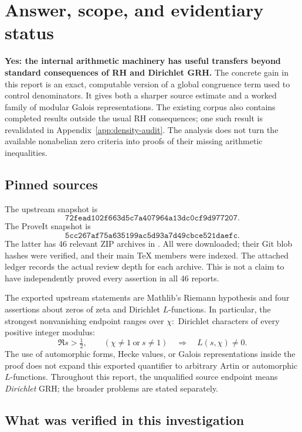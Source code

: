 \section{Answer, scope, and evidentiary status}
\label{sec:scope}

\textbf{Yes: the internal arithmetic machinery has useful transfers beyond
standard consequences of RH and Dirichlet GRH.} The concrete gain in this
report is an exact, computable version of a global congruence term used
to control denominators. It gives both a sharper source estimate and a
worked family of modular Galois representations. The existing corpus also
contains completed results outside the usual RH consequences; one such
result is revalidated in Appendix~\ref{app:density-audit}.
The analysis does not turn the available nonabelian zero criteria into
proofs of their missing arithmetic inequalities.

\subsection{Pinned sources}

The upstream snapshot is
\[
 \texttt{72fead102f663d5c7a407964a13dc0cf9d977207}.
\]
The ProveIt snapshot is
\[
 \texttt{5cc267af75a635199ac5d93a7d49cbce521daefc}.
\]
The latter has 46 relevant ZIP archives in .
All were downloaded; their Git blob hashes were verified, and their
main TeX members were indexed. The attached ledger records the actual
review depth for each archive. This is not a claim to have independently
proved every assertion in all 46 reports.\cite{upstream,priorinventory}

The exported upstream statements are Mathlib's Riemann hypothesis and
four assertions about zeros of zeta and Dirichlet \(L\)-functions.
In particular, the strongest nonvanishing endpoint ranges over
\(\chi:\) Dirichlet characters of every positive integer modulus:
\[
 \Re s>\tfrac12,\qquad (\chi\ne1\ \text{or}\ s\ne1)
 \quad\Longrightarrow\quad L(s,\chi)\ne0.
\]
The use of automorphic forms, Hecke values, or Galois representations
inside the proof does not expand this exported quantifier to arbitrary
Artin or automorphic \(L\)-functions.\cite{statements}
Throughout this report, the unqualified source endpoint means
\emph{Dirichlet} GRH; the broader problems are stated separately.

\subsection{What was verified in this investigation}

